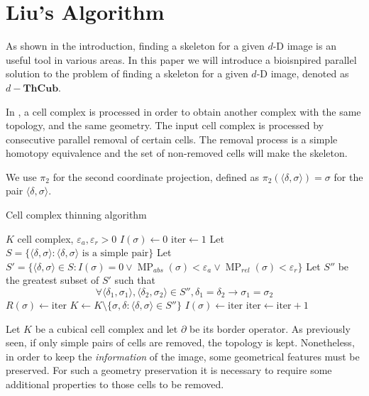 \documentclass[journal]{IEEEtran}
\DeclareMathOperator{\MP}{MP}
\begin{document}
\section{Liu's Algorithm} \label{sec:Liu}
As shown in the introduction, finding a skeleton for a given $d$-D image is an 
useful tool in various areas. In this paper we will introduce a bioisnpired 
parallel solution to the problem of finding a skeleton for a given $d$-D image, 
denoted as $d-\mathbf{ThCub}$.

In \cite{liu20093d}, a cell complex is processed in order to obtain
another complex with the same topology, and the same geometry. The input cell
complex is processed by consecutive parallel removal of certain cells. The
removal process is a simple homotopy equivalence and the set of non-removed cells will make the skeleton. 

 We use $\pi_2$ for the second coordinate projection, defined as $\pi_2(\langle \delta, \sigma \rangle) = \sigma$ for the pair $\langle \delta, \sigma \rangle$.
\begin{algorithm}[t]
 \caption{Cell complex thinning algorithm} \label{alg: Cell thinning}
 \label{alg:CellSkel}
 \begin{algorithmic}
 \REQUIRE $K$ cell complex, $\varepsilon_a, \varepsilon_r > 0$
 \STATE $I(\sigma) \leftarrow 0$
 \ENDFOR
 \STATE $\mbox{iter} \leftarrow 1$
 \REPEAT
 \STATE Let $S = \{\langle \delta, \sigma \rangle: \langle \delta, \sigma
 \rangle \mbox{ is a simple pair}\}$
 \STATE Let $S' =\{\langle \delta, \sigma \rangle \in S:I(\sigma)=0 \vee
 \MP_{abs}(\sigma) < \varepsilon_a \vee \MP_{rel}(\sigma) < \varepsilon_r\}$
 \STATE Let $S''$ be the greatest subset of $S'$ such that $$\forall \langle \delta_1, \sigma_1 \rangle, \langle \delta_2, \sigma_2 \rangle \in S'', \delta_1 = \delta_2 \rightarrow \sigma_1 = \sigma_2$$
 \STATE $R(\sigma) \leftarrow \mbox{iter}$
 \ENDFOR
 \STATE $K \leftarrow K \setminus \{\sigma, \delta: \langle \delta, \sigma \rangle \in S''\}$
 \STATE $I(\sigma) \leftarrow \mbox{iter}$
 \ENDFOR
 \STATE $\mbox{iter} \leftarrow \mbox{iter} + 1$
 \end{algorithmic}
\end{algorithm}

Let $K$ be a cubical cell complex and let $\partial$ be its border
operator. As previously seen, if only simple pairs of cells are removed, the
topology is kept. Nonetheless, in order to keep the {\it information} of the
image, some geometrical features must be preserved. For such a geometry
preservation it is necessary to require some additional properties to those
cells to be removed.
\end{document}
